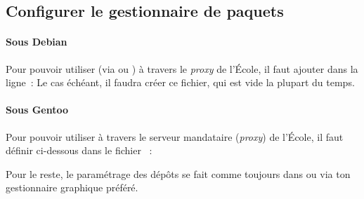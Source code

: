 \subsection{Configurer le gestionnaire de paquets}




\paragraph{Sous Debian}
\label{debian_mirror} Pour pouvoir utiliser  (via  ou ) à travers le \emph{proxy} de l'École, il faut ajouter dans  la ligne~:
Le cas échéant, il faudra créer ce fichier, qui est vide la plupart du temps.

\paragraph{Sous Gentoo}
\label{gentoo_mirror} Pour pouvoir utiliser  à  travers le serveur mandataire (\emph{proxy}) de l'École, il faut définir %
ci-dessous dans le fichier ~:



Pour le reste, le paramétrage des dépôts se fait comme toujours dans  ou via ton gestionnaire graphique préféré.
